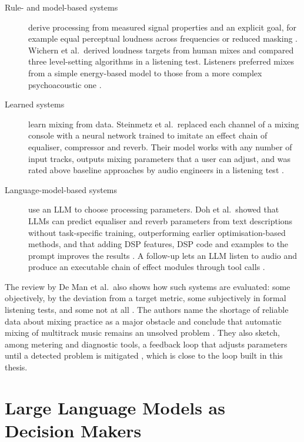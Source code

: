 \begin{description}
	\item[Rule- and model-based systems] derive processing from measured signal properties and an explicit goal, for example equal perceptual loudness across frequencies \cite{PerezGonzalez2009EQ} or reduced masking \cite{Hafezi2015}. Wichern et al.\ derived loudness targets from human mixes and compared three level-setting algorithms in a listening test. Listeners preferred mixes from a simple energy-based model to those from a more complex psychoacoustic one \cite{Wichern2015}.
	\item[Learned systems] learn mixing from data. Steinmetz et al.\ replaced each channel of a mixing console with a neural network trained to imitate an effect chain of equaliser, compressor and reverb. Their model works with any number of input tracks, outputs mixing parameters that a user can adjust, and was rated above baseline approaches by audio engineers in a listening test \cite{Steinmetz2021}.
	\item[Language-model-based systems] use an \ac{LLM} to choose processing parameters. Doh et al.\ showed that \acsp{LLM} can predict equaliser and reverb parameters from text descriptions without task-specific training, outperforming earlier optimisation-based methods, and that adding \ac{DSP} features, \ac{DSP} code and examples to the prompt improves the results \cite{Doh2025LLM2Fx}. A follow-up lets an \ac{LLM} listen to audio and produce an executable chain of effect modules through tool calls \cite{Doh2026LLM2FxTools}.
\end{description}

The review by De Man et al.\ also shows how such systems are evaluated: some objectively, by the deviation from a target metric, some subjectively in formal listening tests, and some not at all \cite{DeMan2017TenYears}. The authors name the shortage of reliable data about mixing practice as a major obstacle and conclude that automatic mixing of multitrack music remains an unsolved problem \cite{DeMan2017TenYears}. They also sketch, among metering and diagnostic tools, a feedback loop that adjusts parameters until a detected problem is mitigated \cite{DeMan2017TenYears}, which is close to the loop built in this thesis.

\section{Large Language Models as Decision Makers}
\label{sec:bg-llm}

